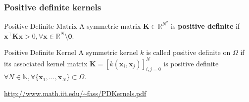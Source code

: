 \documentclass{beamer}
\begin{document}
    \begin{frame}
        \frametitle{Positive definite kernels}
        \begin{block}{Positive Definite Matrix}
            A symmetric matrix $\mathbf K \in \mathbb R^{N^2}$ is \textbf{positive definite} if $\mathbf{x}^\intercal\mathbf K\mathbf{x} > 0, \forall \mathbf x \in \mathbb R^N \setminus \mathbf 0$.
        \end{block}

        \begin{block}{Positive Definite Kernel}
            A symmetric kernel $k$ is called positive definite on $\Omega$ if its associated kernel matrix $\mathbf K = \left[k(\mathbf x_i, \mathbf x_j)\right]_{i, j = 0}^N$ is positive definite $\forall N \in \mathbb N, \forall \{\mathbf x_1, \ldots, \mathbf x_N\} \subset \Omega$.
        \end{block}
        \tiny{\url{http://www.math.iit.edu/~fass/PDKernels.pdf}}
    \end{frame}
\end{document}
